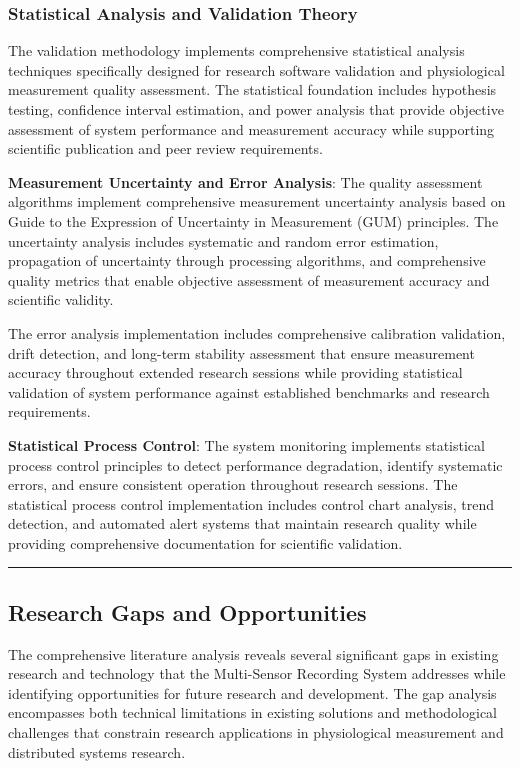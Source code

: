 \documentclass[11pt,a4paper]{report}
\begin{document}
\subsubsection{Statistical Analysis and Validation Theory}

The validation methodology implements comprehensive statistical analysis techniques specifically designed for research
software validation and physiological measurement quality assessment. The statistical foundation includes hypothesis
testing, confidence interval estimation, and power analysis that provide objective assessment of system performance and
measurement accuracy while supporting scientific publication and peer review requirements.

\textbf{Measurement Uncertainty and Error Analysis}: The quality assessment algorithms implement comprehensive measurement
uncertainty analysis based on Guide to the Expression of Uncertainty in Measurement (GUM) principles. The uncertainty
analysis includes systematic and random error estimation, propagation of uncertainty through processing algorithms, and
comprehensive quality metrics that enable objective assessment of measurement accuracy and scientific validity.

The error analysis implementation includes comprehensive calibration validation, drift detection, and long-term
stability assessment that ensure measurement accuracy throughout extended research sessions while providing statistical
validation of system performance against established benchmarks and research requirements.

\textbf{Statistical Process Control}: The system monitoring implements statistical process control principles to detect
performance degradation, identify systematic errors, and ensure consistent operation throughout research sessions. The
statistical process control implementation includes control chart analysis, trend detection, and automated alert systems
that maintain research quality while providing comprehensive documentation for scientific validation.

\hrule

\subsection{Research Gaps and Opportunities}

The comprehensive literature analysis reveals several significant gaps in existing research and technology that the
Multi-Sensor Recording System addresses while identifying opportunities for future research and development. The gap
analysis encompasses both technical limitations in existing solutions and methodological challenges that constrain
research applications in physiological measurement and distributed systems research.
\end{document}

